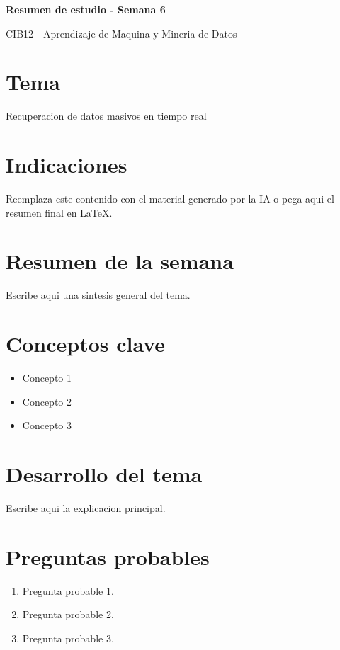 \documentclass[8pt,a4paper,twocolumn]{article}
\newcommand{\resumentitulo}{Resumen de estudio - Semana 6}
\begin{document}
\vspace*{-1.0em}
\begin{tcolorbox}[colback=black!12,colframe=black!35,boxrule=0.3pt,arc=1pt,left=4pt,right=4pt,top=3pt,bottom=3pt]
{\bfseries\normalsize \resumentitulo\par}
{\scriptsize CIB12 - Aprendizaje de Maquina y Mineria de Datos\par}
\end{tcolorbox}
\vspace{0.15em}

\section*{Tema}
Recuperacion de datos masivos en tiempo real

\section*{Indicaciones}
Reemplaza este contenido con el material generado por la IA o pega aqui el resumen final en LaTeX.

\section*{Resumen de la semana}
Escribe aqui una sintesis general del tema.

\section*{Conceptos clave}
\begin{itemize}
    \item Concepto 1
    \item Concepto 2
    \item Concepto 3
\end{itemize}

\section*{Desarrollo del tema}
Escribe aqui la explicacion principal.

\section*{Preguntas probables}
\begin{enumerate}
    \item Pregunta probable 1.
    \item Pregunta probable 2.
    \item Pregunta probable 3.
\end{enumerate}
\end{document}

